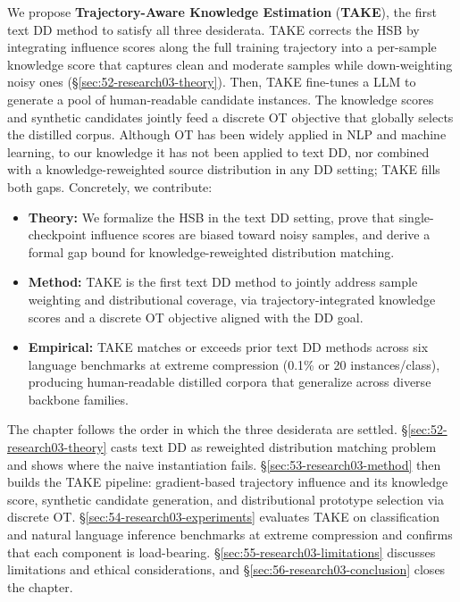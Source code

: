 \begin{foldable} %
  We propose \textbf{Trajectory-Aware Knowledge Estimation} (\textbf{TAKE}), the first text \ac{DD} method to satisfy all three desiderata.
  TAKE corrects the \ac{HSB} by integrating influence scores along the full training trajectory into a per-sample knowledge score that captures clean and moderate samples while down-weighting noisy ones (\S\ref{sec:52-research03-theory}).
  Then, TAKE fine-tunes a \ac{LLM} to generate a pool of human-readable candidate instances.
  The knowledge scores and synthetic candidates jointly feed a discrete \ac{OT} objective that globally selects the distilled corpus.
  Although \ac{OT} has been widely applied in \ac{NLP} and machine learning, to our knowledge it has not been applied to text \ac{DD}, nor combined with a knowledge-reweighted source distribution in any \ac{DD} setting; TAKE fills both gaps.
  Concretely, we contribute:
  \begin{itemize}
    \item {
        \textbf{Theory:} We formalize the \ac{HSB} in the text \ac{DD} setting, prove that single-checkpoint influence scores are biased toward noisy samples, and derive a formal gap bound for knowledge-reweighted distribution matching.
      }
    \item {
        \textbf{Method:} TAKE is the first text \ac{DD} method to jointly address sample weighting and distributional coverage, via trajectory-integrated knowledge scores and a discrete \ac{OT} objective aligned with the \ac{DD} goal.
      }
    \item {
        \textbf{Empirical:} TAKE matches or exceeds prior text \ac{DD} methods across six language benchmarks at extreme compression (0.1\% or 20 instances/class), producing human-readable distilled corpora that generalize across diverse backbone families.
      }
  \end{itemize}
\end{foldable}

\begin{foldable} %
  The chapter follows the order in which the three desiderata are settled.
  \S\ref{sec:52-research03-theory} casts text \ac{DD} as reweighted distribution matching problem and shows where the naive instantiation fails.
  \S\ref{sec:53-research03-method} then builds the TAKE pipeline: gradient-based trajectory influence and its knowledge score, synthetic candidate generation, and distributional prototype selection via discrete \ac{OT}.
  \S\ref{sec:54-research03-experiments} evaluates TAKE on classification and natural language inference benchmarks at extreme compression and confirms that each component is load-bearing.
  \S\ref{sec:55-research03-limitations} discusses limitations and ethical considerations, and \S\ref{sec:56-research03-conclusion} closes the chapter.
\end{foldable}
